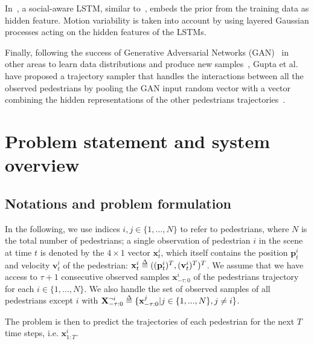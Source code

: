 \documentclass[10pt,twocolumn,letterpaper]{article}
\def\delequal{\mathrel{\ensurestackMath{\stackon[1pt]{=}{\scriptstyle\Delta}}}}
\begin{document}
In~\cite{PlausiblePaths2017}, a social-aware LSTM, similar to~\cite{SocialLSTM2016}, embeds the prior from the training data as hidden feature. Motion variability is taken into account by using layered Gaussian processes acting on the hidden features of the LSTMs.

Finally, following the success of Generative Adversarial Networks (GAN)~\cite{Goodfellow2014} in other areas to learn data distributions and produce new samples~\cite{BEGAN2017}, Gupta et al. have proposed a trajectory sampler that handles the interactions between all the observed pedestrians by pooling the GAN input random vector with a vector combining the hidden representations of the other pedestrians trajectories~\cite{SocialGAN2018}.

\section{Problem statement and system overview}


\def \xObsv {\mathbf{x}^i_{-\tau: 0}}
\def \xPred {\mathbf{x}^i_{1: T}}
\def \XObsv {\mathbf{X}^{-i}_{-\tau: 0}}
\def \XPred {\mathbf{X}^{-i}_{1: T}}

\def \xPredH {\mathbf{\hat{x}}^i_{1: T}}
\def \XPredH {\mathbf{\hat{X}}^{-i}_{1: T}}

\def \TEOM {\mathbf{\hat{m}}^i_{1: T}}
 
\subsection{Notations and problem formulation} 

In the following, we use indices $i,j\in \{1, ..., N\}$ to refer to pedestrians, where $N$ is the total number of pedestrians; a single observation of pedestrian $i$ in the scene at time $t$ is denoted by the $4\times 1$ vector $\mathbf{x}^i_t$, which itself contains the position $\mathbf{p}^{i}_t$ and velocity $\mathbf{v}^{i}_t$ of the pedestrian: 
$\mathbf{x}^i_t \delequal ((\mathbf{p}^{i}_t)^T, (\mathbf{v}^{i}_t)^T)^T$.  We assume that we have access to $\tau+1$ 
consecutive observed samples $\mathbf{x}^i_{-\tau: 0}$ of the pedestrians trajectory
for each $i \in \{1, ..., N\}$. 
We also handle the set of observed samples of all pedestrians except $i$ with 
$\mathbf{X}^{\neg i}_{-\tau: 0} \delequal \{ \mathbf{x}^j_{-\tau: 0} | j \in \{1, ..., N\}, j \neq i \}$.

The problem is then to predict the trajectories of each pedestrian for the next $T$ time steps, i.e. $\mathbf{x}^i_{1: T}$. 
\end{document}
